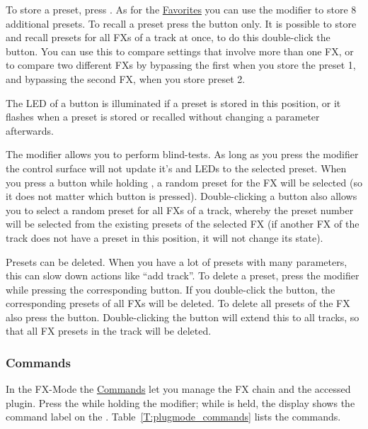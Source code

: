 To store a preset, press \control \rec. As for the
\hyperref[fav]{Favorites} you can use the \shift modifier to store 8
additional presets. To recall a preset press  the \rec button only.
It is possible to store and recall presets for all FXs of a track at
once, to do this  double-click the \rec button. You can use
this to compare settings that involve more than one FX, or to compare
two different FXs by bypassing the first when you store the preset 1, and
bypassing the second FX, when you store preset 2.

The LED of a \rec button is illuminated if a preset is stored in this
position, or it flashes when a preset is stored or recalled without
changing a parameter afterwards.

The \alt modifier allows you to perform blind-tests. As long as you
press the \alt modifier the control surface will not update it's
\faders and LEDs to the selected preset. When you press a \rec button
while holding \alt, a random preset for the FX will be selected (so it
does not matter which \rec button is pressed). Double-clicking a \rec
button also allows you to select a random preset for all FXs of a
track, whereby the preset number will be selected from the existing
presets of the selected FX (if another FX of the track does not have a
preset in this position, it will not change its state).

Presets can be deleted. When you have a lot of presets with many
parameters, this can slow down actions like ``add track''. To delete a
preset, press the \option modifier while pressing the corresponding
\rec button. If you double-click the \rec button, the corresponding
presets of all FXs will be deleted. To delete all presets of the FX
also press the \alt button. Double-clicking the \rec button will
extend this to all tracks, so that all FX presets in the track will be
deleted.

\subsubsection{Commands}\label{plugcommands}
In the FX-Mode the \hyperref[commands]{Commands} let you manage the FX
chain and the accessed plugin. Press the \vpot while holding the \control
modifier; while \control is held, the display shows the command label on
the \vpots. Table~\ref{T:plugmode_commands} lists the commands.

\vspace{-3mm}

